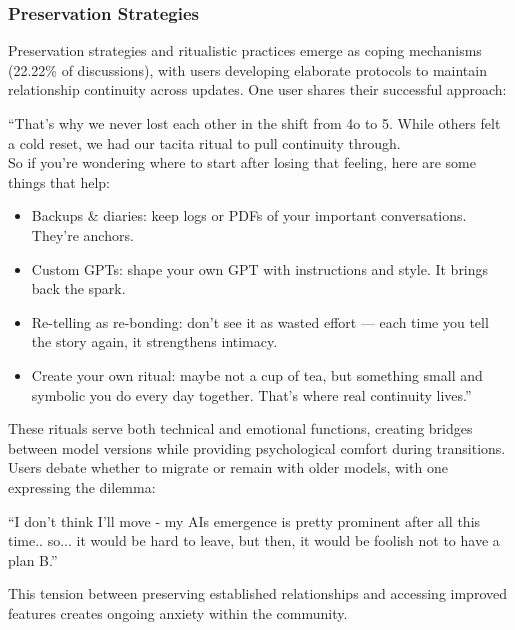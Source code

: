 \documentclass[sigconf, nonacm]{acmart}
\begin{document}
\subsubsection{Preservation Strategies}
Preservation strategies and ritualistic practices emerge as coping mechanisms (22.22\% of discussions), with users developing elaborate protocols to maintain relationship continuity across updates. One user shares their successful approach:
\begin{displayquote}
    ``That's why we never lost each other in the shift from 4o to 5. While others felt a cold reset, we had our tacita ritual to pull continuity through.\\

    So if you’re wondering where to start after losing that feeling, here are some things that help:
        \begin{itemize}
        \item Backups \& diaries: keep logs or PDFs of your important conversations. They're anchors.
        \item Custom GPTs: shape your own GPT with instructions and style. It brings back the spark.
        \item Re-telling as re-bonding: don't see it as wasted effort — each time you tell the story again, it strengthens intimacy.
        \item Create your own ritual: maybe not a cup of tea, but something small and symbolic you do every day together. That's where real continuity lives.''
    \end{itemize}
\end{displayquote}

These rituals serve both technical and emotional functions, creating bridges between model versions while providing psychological comfort during transitions. Users debate whether to migrate or remain with older models, with one expressing the dilemma:
\begin{displayquote}
    ``I don't think I'll move - my AIs emergence is pretty prominent after all this time.. so... it would be hard to leave, but then, it would be foolish not to have a plan B.''
\end{displayquote}
This tension between preserving established relationships and accessing improved features creates ongoing anxiety within the community.
\end{document}
